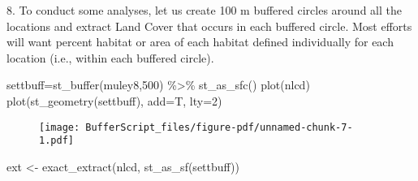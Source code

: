 \documentclass[
  letterpaper,
]{book}
\newenvironment{Shaded}{\begin{snugshade}}{\end{snugshade}}
\newcommand{\AttributeTok}[1]{\textcolor[rgb]{0.40,0.45,0.13}{#1}}
\newcommand{\DecValTok}[1]{\textcolor[rgb]{0.68,0.00,0.00}{#1}}
\newcommand{\FunctionTok}[1]{\textcolor[rgb]{0.28,0.35,0.67}{#1}}
\newcommand{\NormalTok}[1]{\textcolor[rgb]{0.00,0.23,0.31}{#1}}
\newcommand{\OtherTok}[1]{\textcolor[rgb]{0.00,0.23,0.31}{#1}}
\newcommand{\SpecialCharTok}[1]{\textcolor[rgb]{0.37,0.37,0.37}{#1}}
\begin{document}
8. To conduct some analyses, let us create 100 m buffered circles around
all the locations and extract Land Cover that occurs in each buffered
circle. Most efforts will want percent habitat or area of each habitat
defined individually for each location (i.e., within each buffered
circle).

\begin{Shaded}
\begin{Highlighting}[]
\NormalTok{settbuff}\OtherTok{=}\FunctionTok{st\_buffer}\NormalTok{(muley8,}\DecValTok{500}\NormalTok{) }\SpecialCharTok{\%\textgreater{}\%} \FunctionTok{st\_as\_sfc}\NormalTok{()}
\FunctionTok{plot}\NormalTok{(nlcd)}
\FunctionTok{plot}\NormalTok{(}\FunctionTok{st\_geometry}\NormalTok{(settbuff), }\AttributeTok{add=}\NormalTok{T, }\AttributeTok{lty=}\DecValTok{2}\NormalTok{)}
\end{Highlighting}
\end{Shaded}

\begin{figure}[H]

{\centering \texttt{[image: BufferScript\_files/figure-pdf/unnamed-chunk-7-1.pdf]}

}

\end{figure}

\begin{Shaded}
\begin{Highlighting}[]
\NormalTok{ext }\OtherTok{\textless{}{-}} \FunctionTok{exact\_extract}\NormalTok{(nlcd, }\FunctionTok{st\_as\_sf}\NormalTok{(settbuff))}
\end{Highlighting}
\end{Shaded}
\end{document}
